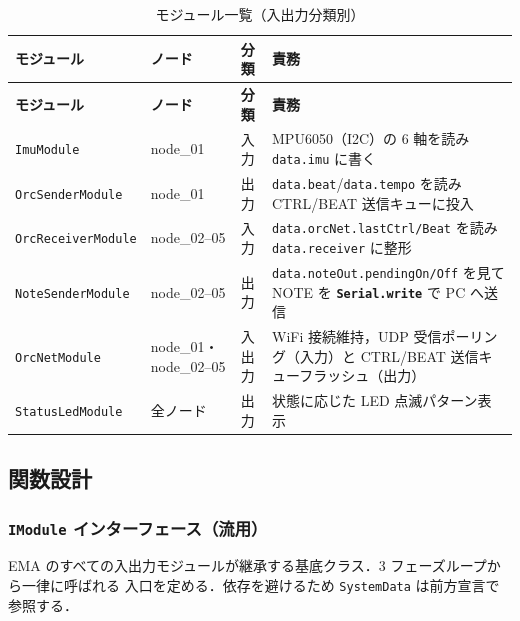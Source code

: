 \documentclass[lualatex,book,paper=a4paper,jafontsize=11.5pt,jafontscale=1.05]{jlreq}
\begin{document}
\begin{longtable}{L{0.18\textwidth} L{0.16\textwidth} L{0.10\textwidth} L{0.42\textwidth}}
\caption{モジュール一覧（入出力分類別）}\label{tab:module-list}\\
\toprule
\textbf{モジュール} & \textbf{ノード} & \textbf{分類} & \textbf{責務} \\
\midrule
\endfirsthead
\toprule
\textbf{モジュール} & \textbf{ノード} & \textbf{分類} & \textbf{責務} \\
\midrule
\endhead
\texttt{ImuModule}        & node\_01     & 入力       & MPU6050（I2C）の 6 軸を読み \texttt{data.imu} に書く \\
\texttt{OrcSenderModule}  & node\_01     & 出力       & \texttt{data.beat}/\texttt{data.tempo} を読み CTRL/BEAT 送信キューに投入 \\
\texttt{OrcReceiverModule}& node\_02--05 & 入力       & \texttt{data.orcNet.lastCtrl/Beat} を読み \texttt{data.receiver} に整形 \\
\texttt{NoteSenderModule} & node\_02--05 & 出力       & \texttt{data.noteOut.pendingOn/Off} を見て NOTE を \textbf{\texttt{Serial.write}} で PC へ送信 \\
\texttt{OrcNetModule}     & node\_01・node\_02--05 & 入出力 & WiFi 接続維持，UDP 受信ポーリング（入力）と CTRL/BEAT 送信キューフラッシュ（出力） \\
\texttt{StatusLedModule}  & 全ノード     & 出力       & 状態に応じた LED 点滅パターン表示 \\
\bottomrule
\end{longtable}

\subsection{関数設計}\label{sec:func-design}

\subsubsection{\texttt{IModule} インターフェース（流用）}

EMA のすべての入出力モジュールが継承する基底クラス．3 フェーズループから一律に呼ばれる
入口を定める．依存を避けるため \texttt{SystemData} は前方宣言で参照する．
\end{document}
